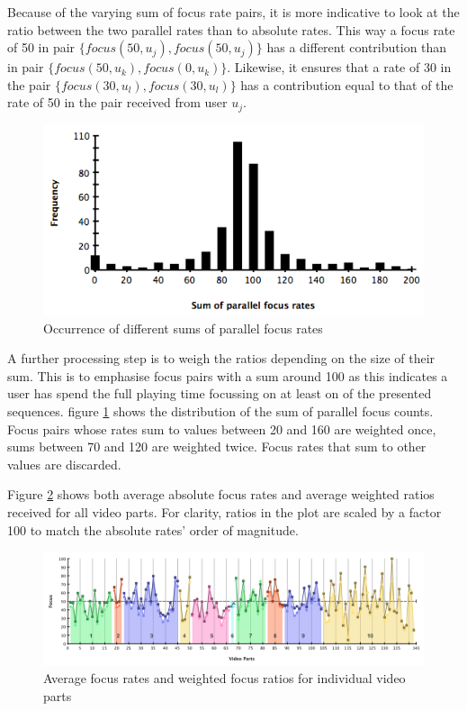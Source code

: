 Because of the varying sum of focus rate pairs, it is more indicative to look at the ratio between the two parallel rates than to absolute rates. This way a focus rate of 50 in pair $\{focus(50,u_j), focus(50,u_j)\}$ has a different contribution than in pair $\{focus(50,u_k), focus(0,u_k)\}$. Likewise, it ensures that a rate of 30 in the pair $\{focus(30,u_l), focus(30,u_l)\}$ has a contribution equal to that of the rate of 50 in the pair received from user $u_j$. 

\begin{figure}[htbp]
  \centering
    \includegraphics[width = .6\textwidth]{img/histogram_ratingsSum}
  \caption{Occurrence of different sums of parallel focus rates}
  \label{fig:histogram_ratingsSum}
\end{figure}

A further processing step is to weigh the ratios depending on the size of their sum. This is to emphasise focus pairs with a sum around 100 as this indicates a user has spend the full playing time focussing on at least on of the presented sequences. figure \ref{fig:histogram_ratingsSum} shows the distribution of the sum of parallel focus counts. Focus pairs whose rates sum to values between 20 and 160 are weighted once, sums between 70 and 120 are weighted twice. Focus rates that sum to other values are discarded.

Figure \ref{fig:videoparts_focus} shows both average absolute focus rates and average weighted ratios received for all video parts. For clarity, ratios in the plot are scaled by a factor 100 to match the absolute rates' order of magnitude.

\begin{figure}[htbp]
  \centering
    \includegraphics[width=\textwidth]{img/videoparts_focus}
  \caption{Average focus rates and weighted focus ratios for individual video parts}
  \label{fig:videoparts_focus}
\end{figure}

